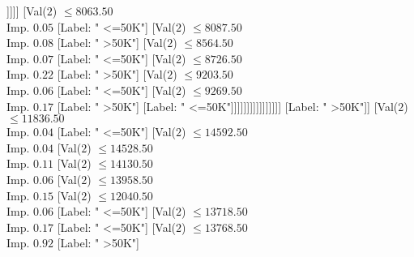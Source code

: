 \documentclass[margin=10pt]{standalone}
\begin{document}
\begin{forest}
																								[Val($2$) $ \leq 5824.50$ \\ Imp. $0.08$
																									[Label: " >50K"]
																									[Val($2$) $ \leq 6122.50$ \\ Imp. $0.15$
																										[Label: " <=50K"]
																										[Val($2$) $ \leq 6542.50$ \\ Imp. $0.20$
																											[Label: " >50K"]
																											[Val($2$) $ \leq 7126.50$ \\ Imp. $0.15$
																												[Label: " <=50K"]
																												[Label: " >50K"]]]]]
																								[Val($2$) $ \leq 8063.50$ \\ Imp. $0.05$
																									[Label: " <=50K"]
																									[Val($2$) $ \leq 8087.50$ \\ Imp. $0.08$
																										[Label: " >50K"]
																										[Val($2$) $ \leq 8564.50$ \\ Imp. $0.07$
																											[Label: " <=50K"]
																											[Val($2$) $ \leq 8726.50$ \\ Imp. $0.22$
																												[Label: " >50K"]
																												[Val($2$) $ \leq 9203.50$ \\ Imp. $0.06$
																													[Label: " <=50K"]
																													[Val($2$) $ \leq 9269.50$ \\ Imp. $0.17$
																														[Label: " >50K"]
																														[Label: " <=50K"]]]]]]]]]]]]]]]]
															[Label: " >50K"]]
														[Val($2$) $ \leq 11836.50$ \\ Imp. $0.04$
															[Label: " <=50K"]
															[Val($2$) $ \leq 14592.50$ \\ Imp. $0.04$
																[Val($2$) $ \leq 14528.50$ \\ Imp. $0.11$
																	[Val($2$) $ \leq 14130.50$ \\ Imp. $0.06$
																		[Val($2$) $ \leq 13958.50$ \\ Imp. $0.15$
																			[Val($2$) $ \leq 12040.50$ \\ Imp. $0.06$
																				[Label: " <=50K"]
																				[Val($2$) $ \leq 13718.50$ \\ Imp. $0.17$
																					[Label: " <=50K"]
																					[Val($2$) $ \leq 13768.50$ \\ Imp. $0.92$
																						[Label: " >50K"]

\end{forest}
\end{document}
